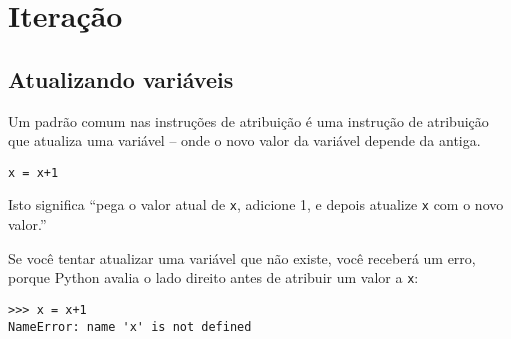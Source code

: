 
\chapter{Iteração}

\section{Atualizando variáveis}
\label{atualizar}



Um padrão comum nas instruções de atribuição é uma instrução de atribuição
que atualiza uma variável -- onde o novo valor da variável depende da antiga.

\beforeverb
\begin{verbatim}
x = x+1
\end{verbatim}
\afterverb
%

%
Isto significa ``pega o valor atual de {\tt x}, adicione 1, e depois atualize
{\tt x} com o novo valor.''


Se você tentar atualizar uma variável que não existe, você receberá um erro,
porque Python avalia o lado direito antes de atribuir um valor a {\tt x}:

\beforeverb
\begin{verbatim}
>>> x = x+1
NameError: name 'x' is not defined
\end{verbatim}
\afterverb
%

